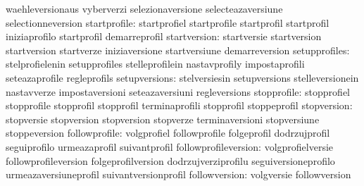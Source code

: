                                   waehleversionaus                 vyberverzi
                                  selezionaversione                selecteazaversiune
                                  selectionneversion
                    startprofile: startprofiel                     startprofile
                                  startprofil                      startprofil
                                  iniziaprofilo                    startprofil
                                  demarreprofil
                    startversion: startversie                      startversion
                                  startversion                     startverze
                                  iniziaversione                   startversiune
                                  demarreversion
                   setupprofiles: stelprofielenin                  setupprofiles
                                  stelleprofilein                  nastavprofily
                                  impostaprofili                   seteazaprofile
                                  regleprofils
                   setupversions: stelversiesin                    setupversions
                                  stelleversionein                 nastavverze
                                  impostaversioni                  seteazaversiuni
                                  regleversions
                     stopprofile: stopprofiel                      stopprofile
                                  stopprofil                       stopprofil
                                  terminaprofili                   stopprofil
                                  stoppeprofil
                     stopversion: stopversie                       stopversion
                                  stopversion                      stopverze
                                  terminaversioni                  stopversiune
                                  stoppeversion
                   followprofile: volgprofiel                      followprofile
                                  folgeprofil                      dodrzujprofil
                                  seguiprofilo                     urmeazaprofil
                                  suivantprofil
            followprofileversion: volgprofielversie                followprofileversion
                                  folgeprofilversion               dodrzujverziprofilu
                                  seguiversioneprofilo             urmeazaversiuneprofil
                                  suivantversionprofil
                   followversion: volgversie                       followversion
